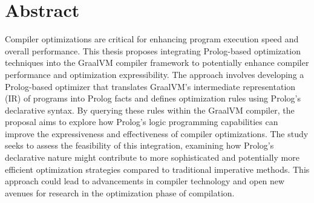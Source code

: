 \chapter[Abstract]{Abstract}

\noindent
Compiler optimizations are critical for enhancing program execution speed and overall performance. This thesis proposes integrating Prolog-based optimization techniques into the GraalVM compiler framework to potentially enhance compiler performance and optimization expressibility. The approach involves developing a Prolog-based optimizer that translates GraalVM’s intermediate representation (IR) of programs into Prolog facts and defines optimization rules using Prolog’s declarative syntax. By querying these rules within the GraalVM compiler, the proposal aims to explore how Prolog’s logic programming capabilities can improve the expressiveness and effectiveness of compiler optimizations. The study seeks to assess the feasibility of this integration, examining how Prolog’s declarative nature might contribute to more sophisticated and potentially more efficient optimization strategies compared to traditional imperative methods. This approach could lead to advancements in compiler technology and open new avenues for research in the optimization phase of compilation.